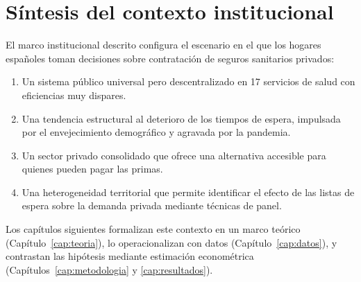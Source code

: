 \section{Síntesis del contexto institucional}

El marco institucional descrito configura el escenario en el que los hogares
españoles toman decisiones sobre contratación de seguros sanitarios privados:

\begin{enumerate}
  \item Un sistema público universal pero descentralizado en 17 servicios de salud
    con eficiencias muy dispares.
  \item Una tendencia estructural al deterioro de los tiempos de espera, impulsada
    por el envejecimiento demográfico y agravada por la pandemia.
  \item Un sector privado consolidado que ofrece una alternativa accesible para
    quienes pueden pagar las primas.
  \item Una heterogeneidad territorial que permite identificar el efecto de las
    listas de espera sobre la demanda privada mediante técnicas de panel.
\end{enumerate}

Los capítulos siguientes formalizan este contexto en un marco teórico
(Capítulo~\ref{cap:teoria}), lo operacionalizan con datos
(Capítulo~\ref{cap:datos}), y contrastan las hipótesis mediante estimación
econométrica (Capítulos~\ref{cap:metodologia} y \ref{cap:resultados}).
